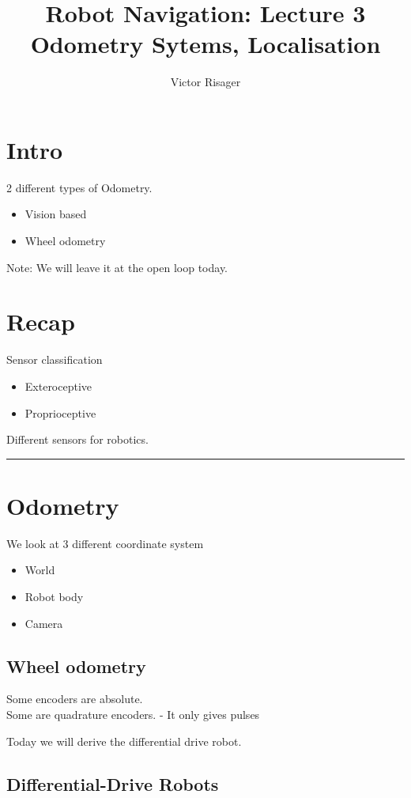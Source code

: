 \documentclass[a4paper]{article}
\title{Robot Navigation: Lecture 3 \\
	\large Odometry Sytems, Localisation}
\author{Victor Risager}
\begin{document}
\maketitle
\section{Intro}
2 different types of Odometry.

\begin{itemize}
	\item Vision based
	\item Wheel odometry
\end{itemize}

Note: We will leave it at the open loop today.

\section{Recap}
Sensor classification
\begin{itemize}
	\item Exteroceptive
	\item Proprioceptive 
\end{itemize}

Different sensors for robotics.

\vspace{5pt}
\hrule
\vspace{5pt}


\section{Odometry}
We look at 3 different coordinate system

\begin{itemize}
	\item World
	\item Robot body 
	\item Camera
\end{itemize}

\subsection{Wheel odometry}
Some encoders are absolute. \\
Some are quadrature encoders.
	- It only gives pulses


Today we will derive the differential drive robot.

\subsection{Differential-Drive Robots}
\end{document}
